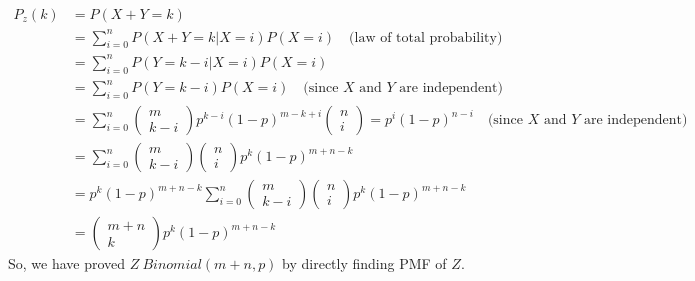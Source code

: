 \documentclass{report}
\begin{document}
$\begin{aligned}
	P_z(k) &= P(X+Y=k) \\
    	&= \sum^n_{i=0} P(X+Y=k | X = i)P(X = i) \quad \text{(law of total probability)} \\
        &= \sum^n_{i=0} P(Y=k-i | X = i)P(X = i) \\
        &= \sum^n_{i=0} P(Y=k-i)P(X = i) \quad \text{(since } X \text{ and } Y \text{ are independent)} \\
        &= \sum^n_{i=0} \begin{pmatrix}
							m \\ 
							k-i
						\end{pmatrix} p^{k-i}(1-p)^{m-k+i} \begin{pmatrix}
                                                              n \\ 
                                                              i
                                                          \end{pmatrix} = p^{i}(1-p)^{n-i} \quad \text{(since $X$ and $Y$ are independent)} \\
        &= \sum^n_{i=0} \begin{pmatrix}
							m \\ 
							k-i
						\end{pmatrix} \begin{pmatrix}
                                          n \\ 
                                          i
                                      \end{pmatrix} p^{k}(1-p)^{m+n-k} \\
        &= p^{k}(1-p)^{m+n-k} \sum^n_{i=0} \begin{pmatrix}
                                                m \\ 
                                                k-i
                                            \end{pmatrix} \begin{pmatrix}
                                                              n \\ 
                                                              i
                                                          \end{pmatrix} p^{k}(1-p)^{m+n-k} \\
        &= \begin{pmatrix}
            m+n \\ 
            k
            \end{pmatrix} p^{k}(1-p)^{m+n-k}
\end{aligned}$\newline\newline
So, we have proved $Z~Binomial(m+n,p)$ by directly finding PMF of $Z$.
\end{document}

